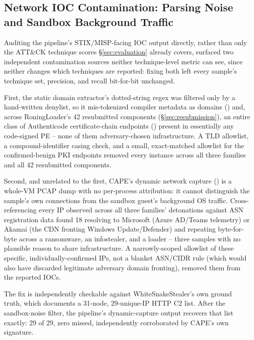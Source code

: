 \subsection{Network IOC Contamination: Parsing Noise and Sandbox
  Background Traffic}
\label{sec:case-ioc-noise}

Auditing the pipeline's STIX/MISP-facing IOC output directly, rather
than only the ATT\&CK technique scores \S\ref{sec:evaluation} already
covers, surfaced two independent contamination sources neither
technique-level metric can see, since neither changes which techniques
are reported: fixing both left every sample's technique set, precision,
and recall bit-for-bit unchanged.

First, the static domain extractor's dotted-string regex was filtered
only by a hand-written denylist, so it mis-tokenized compiler metadata
as domains () and, across RoningLoader's 42
resubmitted components (\S\ref{sec:resubmission}), an entire class of
Authenticode certificate-chain endpoints ()
present in essentially any code-signed PE -- none of them
adversary-chosen infrastructure. A TLD allowlist, a compound-identifier
casing check, and a small, exact-matched allowlist for the
confirmed-benign PKI endpoints removed every instance across all three
families and all 42 resubmitted components.

Second, and unrelated to the first, CAPE's dynamic network capture
() is a whole-VM PCAP dump with no per-process
attribution: it cannot distinguish the sample's own connections from the
sandbox guest's background OS traffic. Cross-referencing every IP
observed across all three families' detonations against ASN
registration data found 18 resolving to Microsoft (Azure AD/Teams
telemetry) or Akamai (the CDN fronting Windows Update/Defender) and
repeating byte-for-byte across a ransomware, an infostealer, and a
loader -- three samples with no plausible reason to share
infrastructure. A narrowly-scoped allowlist of these specific,
individually-confirmed IPs, not a blanket ASN/CIDR rule (which would
also have discarded legitimate adversary domain fronting), removed them
from the reported IOCs.

The fix is independently checkable against WhiteSnakeStealer's own
ground truth, which documents a 31-node, 29-unique-IP HTTP C2 list.
After the sandbox-noise filter, the pipeline's dynamic-capture output
recovers that list exactly: 29 of 29, zero missed, independently
corroborated by CAPE's own  signature.

